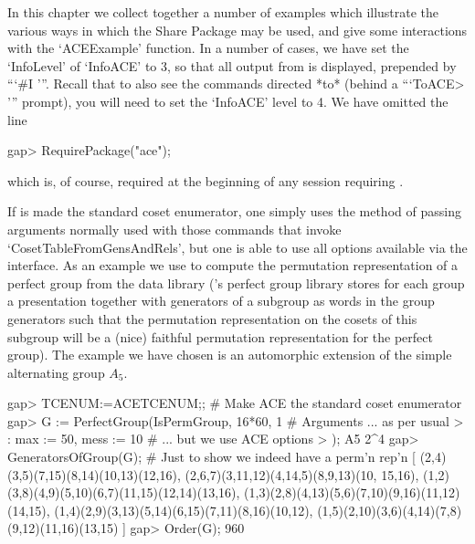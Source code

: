 

In this chapter  we  collect  together  a  number  of  examples  which
illustrate the various ways in which the {\ACE} Share Package  may  be
used, and give some interactions with the `ACEExample' function. In  a
number of cases, we have set the `InfoLevel' of  `InfoACE'  to  3,  so
that all output from {\ACE} is displayed,  prepended  by  ```\#I  '''.
Recall that to also see the commands directed *to*  {\ACE}  (behind  a
```ToACE> ''' prompt), you will need to set the `InfoACE' level to  4.
We have omitted the line

\beginexample
gap> RequirePackage("ace");
\endexample

which is,  of  course,  required  at  the  beginning  of  any  session
requiring {\ACE}.


If {\ACE} is made the standard coset enumerator, one simply  uses  the
method of passing arguments normally used  with  those  commands  that
invoke `CosetTableFromGensAndRels', but one is able to use all options
available via the {\ACE} interface. As an example  we  use  {\ACE}  to
compute the permutation representation of a  perfect  group  from  the
data library ({\GAP}'s perfect group library stores for each  group  a
presentation together with generators of a subgroup as  words  in  the
group generators such  that  the  permutation  representation  on  the
cosets  of  this  subgroup  will  be  a  (nice)  faithful  permutation
representation for the perfect group). The example we have  chosen  is
an automorphic extension of the simple alternating group $A_5$.

\beginexample
gap> TCENUM:=ACETCENUM;; # Make ACE the standard coset enumerator
gap> G := PerfectGroup(IsPermGroup, 16*60, 1   # Arguments ... as per usual
>                      : max := 50, mess := 10 # ... but we use ACE options
>                      );
A5 2^4
gap> GeneratorsOfGroup(G); # Just to show we indeed have a perm'n rep'n
[ (2,4)(3,5)(7,15)(8,14)(10,13)(12,16), (2,6,7)(3,11,12)(4,14,5)(8,9,13)(10,
    15,16), (1,2)(3,8)(4,9)(5,10)(6,7)(11,15)(12,14)(13,16), 
  (1,3)(2,8)(4,13)(5,6)(7,10)(9,16)(11,12)(14,15), 
  (1,4)(2,9)(3,13)(5,14)(6,15)(7,11)(8,16)(10,12), 
  (1,5)(2,10)(3,6)(4,14)(7,8)(9,12)(11,16)(13,15) ]
gap> Order(G);
960
\endexample

